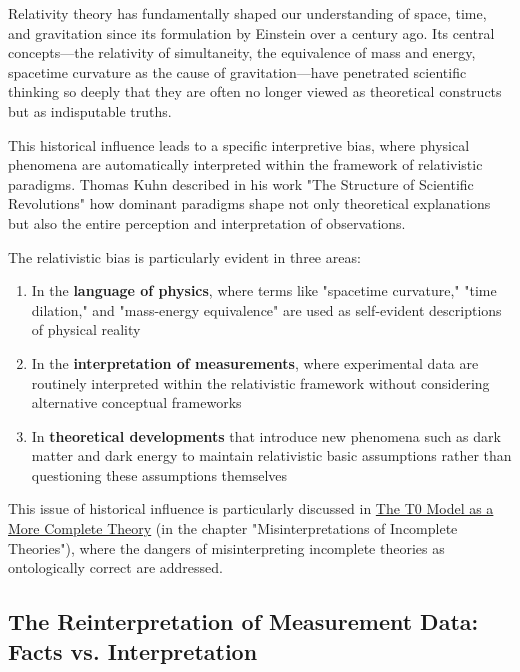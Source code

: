 \documentclass[12pt,a4paper]{article}
\begin{document}
	Relativity theory has fundamentally shaped our understanding of space, time, and gravitation since its formulation by Einstein over a century ago. Its central concepts—the relativity of simultaneity, the equivalence of mass and energy, spacetime curvature as the cause of gravitation—have penetrated scientific thinking so deeply that they are often no longer viewed as theoretical constructs but as indisputable truths.
	
	This historical influence leads to a specific interpretive bias, where physical phenomena are automatically interpreted within the framework of relativistic paradigms. Thomas Kuhn described in his work "The Structure of Scientific Revolutions" \cite{kuhn1962} how dominant paradigms shape not only theoretical explanations but also the entire perception and interpretation of observations.
	
	The relativistic bias is particularly evident in three areas:
	
	\begin{enumerate}
		\item In the \textbf{language of physics}, where terms like "spacetime curvature," "time dilation," and "mass-energy equivalence" are used as self-evident descriptions of physical reality
		
		\item In the \textbf{interpretation of measurements}, where experimental data are routinely interpreted within the relativistic framework without considering alternative conceptual frameworks
		
		\item In \textbf{theoretical developments} that introduce new phenomena such as dark matter and dark energy to maintain relativistic basic assumptions rather than questioning these assumptions themselves
	\end{enumerate}
	
	This issue of historical influence is particularly discussed in \href{https://github.com/jpascher/T0-Time-Mass-Duality/tree/main/2/pdf/English/T0-ModelAsCompleteTheory_En.pdf}{The T0 Model as a More Complete Theory} (in the chapter "Misinterpretations of Incomplete Theories"), where the dangers of misinterpreting incomplete theories as ontologically correct are addressed.
	
	\subsection{The Reinterpretation of Measurement Data: Facts vs. Interpretation}
	\label{subsec:data_reinterpretation}
	
\end{document}
